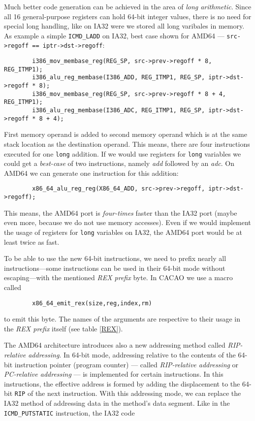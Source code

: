 Much better code generation can be achieved in the area of
\textit{long arithmetic}. Since all 16 general-purpose registers can
hold 64-bit integer values, there is no need for special long
handling, like on IA32 were we stored all long varibales in memory. As
example a simple \texttt{ICMD\_LADD} on IA32, best case shown for
AMD64 --- \texttt{src->regoff == iptr->dst->regoff}:

\begin{verbatim}
        i386_mov_membase_reg(REG_SP, src->prev->regoff * 8, REG_ITMP1);
        i386_alu_reg_membase(I386_ADD, REG_ITMP1, REG_SP, iptr->dst->regoff * 8);
        i386_mov_membase_reg(REG_SP, src->prev->regoff * 8 + 4, REG_ITMP1);
        i386_alu_reg_membase(I386_ADC, REG_ITMP1, REG_SP, iptr->dst->regoff * 8 + 4);
\end{verbatim}

First memory operand is added to second memory operand which is at the
same stack location as the destination operand. This means, there are
four instructions executed for one \texttt{long} addition. If we would
use registers for \texttt{long} variables we could get a
\textit{best-case} of two instructions, namely \textit{add} followed
by an \textit{adc}. On AMD64 we can generate one instruction for this
addition:

\begin{verbatim}
        x86_64_alu_reg_reg(X86_64_ADD, src->prev->regoff, iptr->dst->regoff);
\end{verbatim}

This means, the AMD64 port is \textit{four-times} faster than the IA32
port (maybe even more, because we do not use memory accesses). Even if
we would implement the usage of registers for \texttt{long} variables
on IA32, the AMD64 port would be at least twice as fast.

To be able to use the new 64-bit instructions, we need to prefix
nearly all instructions---some instructions can be used in their
64-bit mode without escaping---with the mentioned \textit{REX prefix}
byte. In CACAO we use a macro called

\begin{verbatim}
        x86_64_emit_rex(size,reg,index,rm)
\end{verbatim}

to emit this byte. The names of the arguments are respective to their
usage in the \textit{REX prefix} itself (see table \ref{REX}).

The AMD64 architecture introduces also a new addressing method called
\textit{RIP-relative addressing}. In 64-bit mode, addressing relative
to the contents of the 64-bit instruction pointer (program counter)
--- called \textit{RIP-relative addressing} or \textit{PC-relative
addressing} --- is implemented for certain instructions. In this
instructions, the effective address is formed by adding the
displacement to the 64-bit \texttt{RIP} of the next instruction. With
this addressing mode, we can replace the IA32 method of addressing
data in the method's data segment. Like in the
\texttt{ICMD\_PUTSTATIC} instruction, the IA32 code


